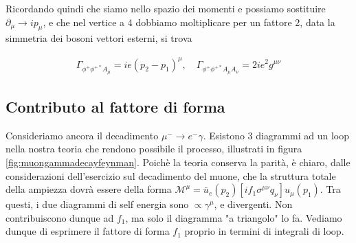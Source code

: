 \documentclass[11pt]{report}
\begin{document}
Ricordando quindi che siamo nello spazio dei momenti e possiamo sostituire \(\partial_\mu \to ip_\mu\), e che nel vertice a 4 dobbiamo moltiplicare per un fattore 2, data la simmetria dei bosoni vettori esterni, si trova 

\begin{align}
    \Gamma_{\phi^+ \phi^{+*} A_\mu} = ie(p_2-p_1)^\mu, \quad \Gamma_{\phi^+ \phi^{+*} A_\mu A_\nu} = 2ie^2 g^{\mu\nu}
\end{align}

\subsection{Contributo al fattore di forma}

Consideriamo ancora il decadimento \(\mu^- \to e^- \gamma\). Esistono 3 diagrammi ad un loop nella nostra teoria che rendono possibile il processo, illustrati in figura \ref{fig:muongammadecayfeynman}. Poichè la teoria conserva la parità, è chiaro, dalle considerazioni dell'esercizio sul decadimento del muone, che la struttura totale della ampiezza dovrà essere della forma \(\mathcal{M}^\mu = \bar{u}_e(p_2)[if_1 \sigma^{\mu\nu}q_\nu] u_\mu (p_1)\). Tra questi, i due diagrammi di self energia sono \(\propto \gamma^\mu\), e divergenti. Non contribuiscono dunque ad \(f_1\), ma solo il diagramma "a triangolo" lo fa. Vediamo dunque di esprimere il fattore di forma \(f_1\) proprio in termini di integrali di loop.    
\end{document}
